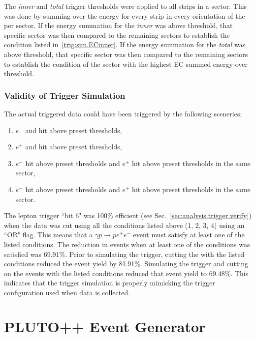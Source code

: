 		The  \emph{inner} and  \emph{total} trigger thresholds were applied to all  strips in a sector. This was done by summing over the energy for every strip in every orientation of the  per sector. If the energy summation for the  \emph{inner} was above threshold,   that specific sector was then compared to the remaining sectors to establish the condition listed in~\ref{trig:sim.ECinner}. If the energy summation for the  \emph{total} was above threshold, that specific sector was then compared to the remaining sectors to establish the condition of the sector with the highest EC summed energy over threshold.
		
		\subsubsection{Validity of Trigger Simulation}
			The actual triggered data could have been triggered by the following sceneries;
			\begin{enumerate}\label{trig:get.all}
				\item $e^-$  and  hit above preset thresholds,
				\item $e^+$  and  hit above preset thresholds,
				\item $e^-$  hit above preset thresholds and $e^+$  hit above preset thresholds in the same sector, 
				\item $e^-$  hit above preset thresholds and $e^+$  hit above preset thresholds in the same sector. 
			\end{enumerate}
			The lepton trigger ``bit 6" was 100\% efficient (see Sec.~\ref{sec:analysis.trigger.verify}) when the data was cut using all the conditions listed above (1, 2, 3, 4) using an ``OR" flag. This means that a $\gamma p \to p e^+ e^-$ event must satisfy at least one of the listed conditions. The reduction in events when at least one of the conditions was satisfied was 69.91\%. Prior to simulating the trigger, cutting the  with the listed conditions reduced the event yield by 81.91\%. Simulating the trigger and cutting on the  events with the listed conditions reduced that event yield to 69.48\%. This indicates that the trigger simulation is properly mimicking the trigger configuration used when data is collected. 

\section{PLUTO++ Event Generator}\label{sec:pluto}

